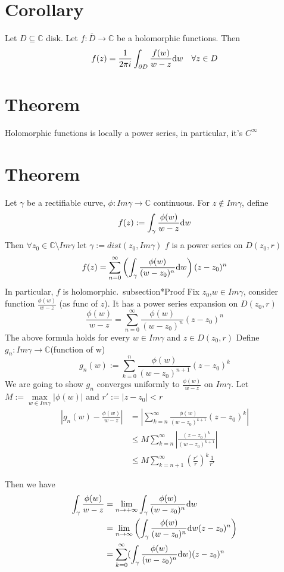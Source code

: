 \documentclass{book}
\newcommand{\abs}[1]{\left\lvert #1 \right\rvert}
\begin{document}
\section{Corollary}
Let $D\subseteq \mathbb C$ disk. Let $f:\overline D\to \mathbb C$ be a holomorphic functions. Then $$f(z)=\frac{1}{2\pi i}\int_{\partial D}\frac{f(w)}{w-z}\text dw\quad\forall z\in D$$
\section{Theorem}Holomorphic functions is locally a power series, in particular, it's $C^\infty$
\section{Theorem}Let $\gamma$ be a rectifiable curve, $\phi:Im\gamma\to \mathbb C$ continuous. For $z\notin Im \gamma$, define $$f(z):=\int_\gamma\frac{\phi(w)}{w-z}\text dw$$
Then $\forall z_0\in \mathbb C\setminus Im\gamma$ let $\gamma:=dist(z_0,Im\gamma)$ $f$ is a power series on $D(z_0,r)$
$$f(z)=\sum\limits_{n=0}^\infty\left(\int_\gamma\frac{\phi(w)}{(w-z_0)^{n}}\text dw\right)(z-z_0)^n$$
In particular, $f$ is holomorphic.\
subsection*{Proof}
Fix $z_0$,$w\in Im\gamma$, consider function $\frac{\phi(w)}{w-z}$ (as func of $z$). It has a power series expansion on $D(z_0,r)$
$$\frac{\phi(w)}{w-z}=\sum\limits_{n=0}^\infty\frac{\phi(w)}{(w-z_0)^n}(z-z_0)^n$$
The above formula holds for every $w\in Im\gamma$ and $z\in D(z_0,r)$ Define $g_n:Im\gamma\to \mathbb C$(function of w)
$$g_n(w):=\sum\limits_{k=0}^n\frac{\phi(w)}{(w-z_0)^{n+1}}(z-z_0)^{k}$$
We are going to show $g_n$ converges uniformly to $\frac{\phi(w)}{w-z}$ on $Im\gamma$. Let $M:=\max\limits_{w\in Im\gamma}\abs{\phi(w)}$ and $r':=\abs{z-z_0}<r$
$$\begin{aligned}
    \abs{g_n(w)-\frac{\phi(w)}{w-z}}&=\abs{\sum\limits_{k=n}^\infty\frac{\phi(w)}{(w-z_0)^{k+1}}(z-z_0)^k}\\
    &\leq M\sum\limits_{k=n}^\infty\abs{\frac{(z-z_0)^k}{(w-z_0)^{k+1}}}\\
    &\leq M\sum\limits_{k=n+1}^\infty(\frac{r'}r)^k\frac{1}{r'}
\end{aligned}$$

Then we have 
$$\begin{aligned}
    \int_\gamma\frac{\phi(w)}{w-z}&=\lim\limits_{n\to+\infty}\int_\gamma\frac{\phi(w)}{(w-z_0)^n}\text dw\\
    &=\lim\limits_{n\to\infty}\left(\int_\gamma\frac{\phi(w)}{(w-z_0)^n}\text dw(z-z_0)^n\right)\\
    &=\sum\limits_{k=0}^\infty(\int_\gamma\frac{\phi(w)}{(w-z_0)^n}\text dw)(z-z_0)^n
\end{aligned}$$
\end{document}
